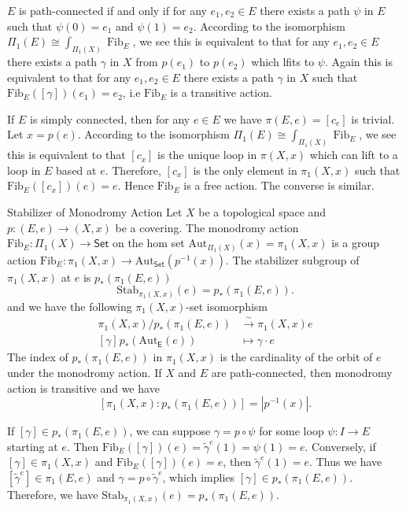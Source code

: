 \documentclass{report}
\begin{document}
\begin{prf}$E$ is path-connected if and only if for any $e_1,e_2\in E$ there exists a path $\psi$ in $E$ such that $\psi(0)=e_1$ and $\psi(1)=e_2$. According to the isomorphism $\Pi_1(E) \cong \int_{\Pi_1(X)} \operatorname{Fib}_E$, we see this is equivalent to that for any $e_1,e_2\in E$ there exists a path $\gamma$ in $X$ from $p(e_1)$ to $p(e_2)$ which lfits to $\psi$. Again this is equivalent to that for any $e_1,e_2\in E$ there exists a path $\gamma$ in $X$ such that $\mathrm{Fib}_E([\gamma])(e_1)=e_2$, i.e $\mathrm{Fib}_E$ is a transitive action.

If $E$ is simply connected, then for any $e\in E$ we have $\pi(E,e)=[c_e]$ is trivial. Let $x=p(e)$. According to the isomorphism $\Pi_1(E) \cong \int_{\Pi_1(X)} \operatorname{Fib}_E$, we see this is equivalent to that $[c_x]$ is the unique loop in $\pi(X,x)$ which can lift to a loop in $E$ based at $e$. Therefore, $[c_x]$ is the only element in $\pi_1(X,x)$ such that $\mathrm{Fib}_E([c_x])(e)=e$. Hence $\mathrm{Fib}_E$ is a free action. The converse is similar.
\end{prf}



\begin{proposition}{Stabilizer of Monodromy Action}{}
	Let $X$ be a topological space and $p:(E,e)\to (X,x)$ be a covering. The monodromy action $\mathrm{Fib}_E:\Pi_1(X)\to \mathsf{Set}$ on the hom set $\mathrm{Aut}_{\Pi_1(X)}(x)=\pi_1(X, x)$ is a group action $\mathrm{Fib}_E:\pi_1(X, x)\to \mathrm{Aut}_{\mathsf{Set}}(p^{-1}(x))$. The stabilizer subgroup of $\pi_1(X, x)$ at $e$ is $p_*(\pi_1(E, e))$
	\[
	\mathrm{Stab}_{\pi_1(X, x)}(e)=p_*(\pi_1(E, e)).
	\]
	and we have the following $\pi_1(X, x)$-set isomorphism
	\begin{align*}
		\pi_1(X, x)/p_*\left(\pi_1(E, e)\right) &\stackrel{\sim}{\longrightarrow} \pi_1(X, x)e\\
		[\gamma]\hspace{1pt}p_*(\mathrm{Aut}_{\mathsf{E}}(e)) &\longmapsto \gamma\cdot e
	\end{align*}
	The index of $p_*(\pi_1(E, e))$ in $\pi_1(X, x)$ is the cardinality of the orbit of $e$ under the monodromy action. If $X$ and $E$ are path-connected, then monodromy action is transitive and we have
	\[
	\left[ \pi_1(X, x):p_*(\pi_1(E, e))\right]=\left|p^{-1}(x)\right|.
	\]
\end{proposition}

\begin{prf}
	If $[\gamma]\in p_*(\pi_1(E, e))$, we can suppose $\gamma=p\circ \psi$ for some loop $\psi:I\to E$ starting at $e$. Then $\mathrm{Fib}_E([\gamma])(e) = \widetilde{\gamma}^{e}(1)=\psi(1)=e$. Conversely, if $[\gamma]\in\pi_1(X,x)$ and $\mathrm{Fib}_E([\gamma])(e)=e$, then $\widetilde{\gamma}^{e}(1)=e$. Thus we have $\left[\widetilde{\gamma}^{e}\right]\in \pi_1(E,e)$ and  $\gamma=p\circ \widetilde{\gamma}^{e}$, which implies $[\gamma]\in p_*(\pi_1(E, e))$. Therefore, we have $\mathrm{Stab}_{\pi_1(X, x)}(e)=p_*(\pi_1(E, e))$.
\end{prf}
\end{document}

